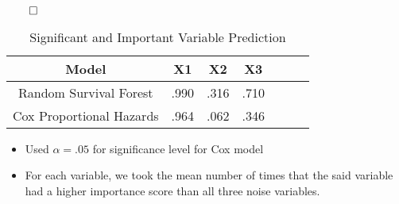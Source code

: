\documentclass{article}
\begin{document}
\begin{flushright} 
\(\qed\)
\end{flushright} 


\newpage

\begin{table}[ht]
\caption{Significant and Important Variable Prediction} %
\centering %
\begin{tabular}{c c c c c c c } %
\hline\hline %
Model & X1 & X2 & X3 \\ [0.5ex] %
\hline %
Random Survival Forest & .990 & .316 & .710  \\ %
Cox Proportional Hazards & .964 & .062 & .346 \\ [1ex] %
\hline %
\end{tabular}
\label{table:nonlin} %
\end{table}

\vspace{1cm}

\begin{itemize}
\item Used \(\alpha = .05\) for significance level for Cox model
\item For each variable, we took the mean number of times that the said variable had a higher importance score than all three noise variables. 
\end{itemize}
\end{document}
